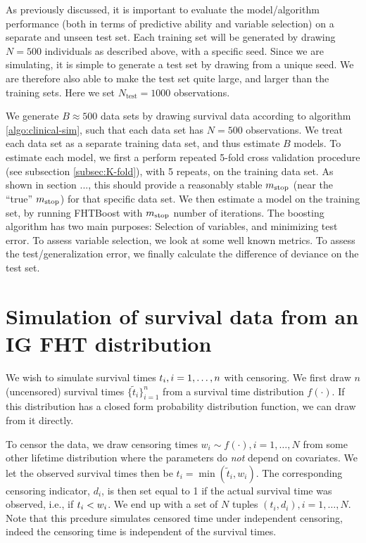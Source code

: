 As previously discussed, it is important to evaluate the model/algorithm performance (both in terms of predictive ability and variable selection) on a separate and unseen test set.
Each training set will be generated by drawing $N=500$ individuals as described above, with a specific seed.
Since we are simulating, it is simple to generate a test set by drawing from a unique seed.
We are therefore also able to make the test set quite large, and larger than the training sets.
Here we set $N_{\text{test}}=1000$ observations.

We generate $B\approx500$ data sets by drawing survival data according to algorithm \ref{algo:clinical-sim}, such that each data set has $N=500$ observations. 
We treat each data set as a separate training data set, and thus estimate $B$ models.
To estimate each model, we first a perform repeated 5-fold cross validation procedure (see subsection \ref{subsec:K-fold}), with 5 repeats, on the training data set.
As shown in section ..., this should provide a reasonably stable $m_{\text{stop}}$ (near the ``true'' $m_{\text{stop}}$) for that specific data set.
We then estimate a model on the training set, by running FHTBoost with $m_{\text{stop}}$ number of iterations.
The boosting algorithm has two main purposes: Selection of variables, and minimizing test error.
To assess variable selection, we look at some well known metrics.
To assess the test/generalization error, we finally calculate the difference of deviance on the test set.

\section{Simulation of survival data from an IG FHT distribution}\label{sec:simulate-IG-data}
We wish to simulate survival times $t_{i},i=1,\ldots,n$ with censoring.
We first draw $n$ (uncensored) survival times $\{\tilde{t}_i\}_{i=1}^n$ from a survival time distribution $f(\cdot)$.
If this distribution has a closed form probability distribution function, we can draw from it directly.

To censor the data, we draw censoring times $w_i\sim f(\cdot),i=1,\ldots,N$ from some other lifetime distribution where the parameters do \textit{not} depend on covariates.
We let the observed survival times then be $t_i=\min(\tilde{t}_i,w_i)$.
The corresponding censoring indicator, $d_i$, is then set equal to 1 if the actual survival time was observed, i.e., if $t_{i}<w_i$.
We end up with a set of $N$ tuples $(t_i,d_i),i=1,\ldots,N$.
Note that this prcedure simulates censored time under independent censoring, indeed the censoring time is independent of the survival times.

